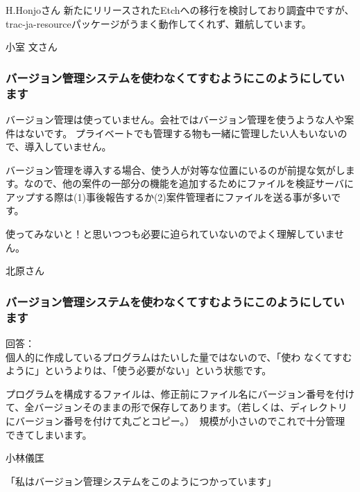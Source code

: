 \documentclass[cjk,dvipdfmx,12pt]{beamer}
\begin{document}
\begin{frame}{H.Honjoさん}
新たにリリースされたEtchへの移行を検討しており調査中ですが、
trac-ja-resourceパッケージがうまく動作してくれず、難航しています。

\end{frame}\begin{frame}{小室 文さん}
\subsubsection{バージョン管理システムを使わなくてすむようにこのようにしています}

バージョン管理は使っていません。会社ではバージョン管理を使うような人や案件はないです。
プライベートでも管理する物も一緒に管理したい人もいないので、導入していません。

バージョン管理を導入する場合、使う人が対等な位置にいるのが前提な気がします。なので、他の案件の一部分の機能を追加するためにファイルを検証サーバにアップする際は(1)事後報告するか(2)案件管理者にファイルを送る事が多いです。

使ってみないと！と思いつつも必要に迫られていないのでよく理解していません。


\end{frame}\begin{frame}{北原さん}

\subsubsection{バージョン管理システムを使わなくてすむようにこのようにしています}


回答：\\
個人的に作成しているプログラムはたいした量ではないので、「使わ
なくてすむように」というよりは、「使う必要がない」という状態です。　　

プログラムを構成するファイルは、修正前にファイル名にバージョン番号を付け
て、全バージョンそのままの形で保存してあります。（若しくは、ディレクトリ
にバージョン番号を付けて丸ごとコピー。）　規模が小さいのでこれで十分管理
できてしまいます。

\end{frame}\begin{frame}{小林儀匡}

「私はバージョン管理システムをこのようにつかっています」


\end{frame}
\end{document}
